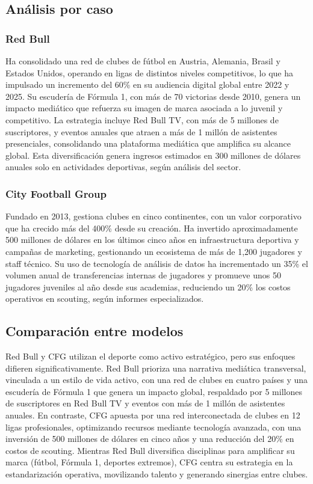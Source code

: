 \documentclass[12pt,a4paper]{article}
\begin{document}
\subsection{Análisis por caso}


\subsubsection{Red Bull}

Ha consolidado una red de clubes de fútbol en Austria, Alemania, Brasil y Estados Unidos, operando en ligas de distintos niveles competitivos, lo que ha impulsado un incremento del 60\% en su audiencia digital global entre 2022 y 2025. Su escudería de Fórmula 1, con más de 70 victorias desde 2010, genera un impacto mediático que refuerza su imagen de marca asociada a lo juvenil y competitivo. La estrategia incluye Red Bull TV, con más de 5 millones de suscriptores, y eventos anuales que atraen a más de 1 millón de asistentes presenciales, consolidando una plataforma mediática que amplifica su alcance global. Esta diversificación genera ingresos estimados en 300 millones de dólares anuales solo en actividades deportivas, según análisis del sector.

\subsubsection{City Football Group}

Fundado en 2013, gestiona clubes en cinco continentes, con un valor corporativo que ha crecido más del 400\% desde su creación. Ha invertido aproximadamente 500 millones de dólares en los últimos cinco años en infraestructura deportiva y campañas de marketing, gestionando un ecosistema de más de 1,200 jugadores y staff técnico. Su uso de tecnología de análisis de datos ha incrementado un 35\% el volumen anual de transferencias internas de jugadores y promueve unos 50 jugadores juveniles al año desde sus academias, reduciendo un 20\% los costos operativos en scouting, según informes especializados.

\subsection{Comparación entre modelos}

Red Bull y CFG utilizan el deporte como activo estratégico, pero sus enfoques difieren significativamente. Red Bull prioriza una narrativa mediática transversal, vinculada a un estilo de vida activo, con una red de clubes en cuatro países y una escudería de Fórmula 1 que genera un impacto global, respaldado por 5 millones de suscriptores en Red Bull TV y eventos con más de 1 millón de asistentes anuales. En contraste, CFG apuesta por una red interconectada de clubes en 12 ligas profesionales, optimizando recursos mediante tecnología avanzada, con una inversión de 500 millones de dólares en cinco años y una reducción del 20\% en costos de scouting. Mientras Red Bull diversifica disciplinas para amplificar su marca (fútbol, Fórmula 1, deportes extremos), CFG centra su estrategia en la estandarización operativa, movilizando talento y generando sinergias entre clubes.
\end{document}
